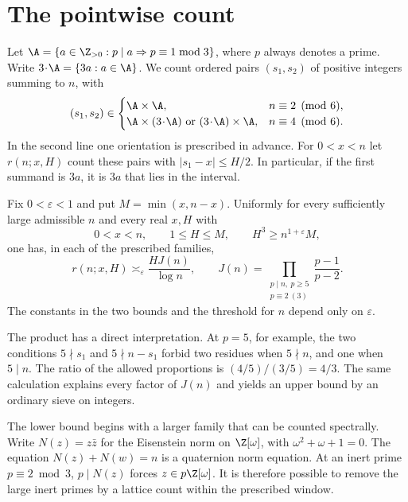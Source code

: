 \section{The pointwise count}
Let \(\A=\{a\in\Z_{>0}:p\mid a\Rightarrow p\equiv1\bmod3\}\), where \(p\)
always denotes a prime. Write \(3\!\cdot\!\A=\{3a:a\in\A\}\).
We count ordered pairs \((s_1,s_2)\) of positive integers summing to
\(n\), with
\[
(s_1,s_2)\in
\begin{cases}
\A\times\A,&n\equiv2\pmod6,\\
\A\times(3\!\cdot\!\A)\text{ or }(3\!\cdot\!\A)\times\A,
 &n\equiv4\pmod6.
\end{cases}
\]
In the second line one orientation is prescribed in advance.
For \(0<x<n\) let \(r(n;x,H)\) count these pairs with
\(|s_1-x|\le H/2\). In particular, if the first summand is \(3a\),
it is \(3a\) that lies in the interval.

\begin{theorem}\label{thm:main}
Fix \(0<\varepsilon<1\) and put \(M=\min(x,n-x)\). Uniformly for
every sufficiently large admissible \(n\) and every real \(x,H\) with
\[
0<x<n,\qquad 1\le H\le M,\qquad H^3\ge n^{1+\varepsilon}M,
\]
one has, in each of the prescribed families,
\begin{equation}\label{eq:main}
r(n;x,H)\asymp_\varepsilon \frac{HJ(n)}{\log n},
\qquad
J(n)=\prod_{\substack{p\mid n,\ p\ge5\\p\equiv2\ (3)}}
             \frac{p-1}{p-2}.
\end{equation}
The constants in the two bounds and the threshold for \(n\) depend
only on \(\varepsilon\).
\end{theorem}

The product has a direct interpretation. At \(p=5\), for example,
the two conditions \(5\nmid s_1\) and \(5\nmid n-s_1\) forbid two
residues when \(5\nmid n\), and one when \(5\mid n\). The ratio of
the allowed proportions is \((4/5)/(3/5)=4/3\). The same calculation
explains every factor of \(J(n)\) and yields an upper bound by an
ordinary sieve on integers.

The lower bound begins with a larger family that can be counted
spectrally. Write \(N(z)=z\bar z\) for the Eisenstein norm on
\(\Z[\omega]\), with \(\omega^2+\omega+1=0\). The equation
\(N(z)+N(w)=n\) is a quaternion norm equation. At an inert prime
\(p\equiv2\bmod3\), \(p\mid N(z)\) forces \(z\in p\Z[\omega]\).
It is therefore possible to remove the large inert primes by a
lattice count within the prescribed window.

